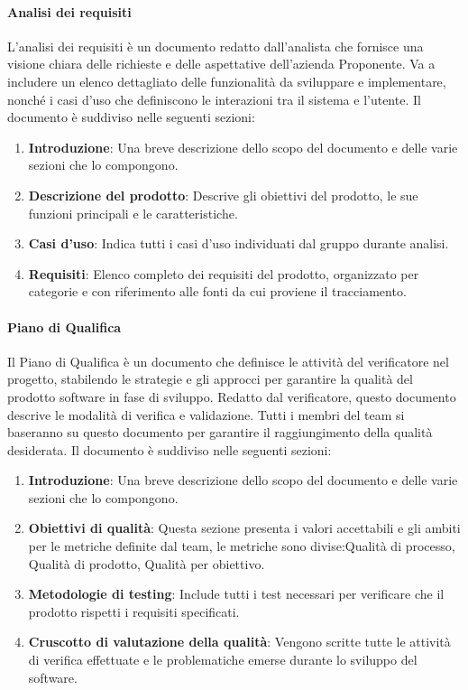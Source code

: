\paragraph{Analisi dei requisiti}
L’analisi dei requisiti è un documento redatto dall’analista che fornisce una visione chiara delle richieste e delle aspettative dell’azienda Proponente. Va a includere un elenco dettagliato delle funzionalità da sviluppare e implementare, nonché i casi d’uso che definiscono le interazioni tra il sistema e l’utente.
Il documento è suddiviso nelle seguenti sezioni:
\begin{enumerate}
    \item \textbf{Introduzione}: Una breve descrizione dello scopo del documento e delle varie sezioni che lo compongono.
    \item \textbf{Descrizione del prodotto}: Descrive gli obiettivi del prodotto, le sue funzioni principali e le caratteristiche.
    \item \textbf{Casi d’uso}: Indica tutti i casi d’uso individuati dal gruppo durante analisi.
    \item \textbf{Requisiti}: Elenco completo dei requisiti del prodotto, organizzato per categorie e con riferimento alle fonti da cui proviene il tracciamento.
\end{enumerate}

\paragraph{Piano di Qualifica}
Il Piano di Qualifica è un documento che definisce le attività del verificatore nel progetto, stabilendo le strategie e gli approcci per garantire la qualità del prodotto software in fase di sviluppo. Redatto dal verificatore, questo documento descrive le modalità di verifica e validazione. Tutti i membri del team si baseranno su questo documento per garantire il raggiungimento della qualità desiderata.
Il documento è suddiviso nelle seguenti sezioni: 
\begin{enumerate}
    \item \textbf{Introduzione}: Una breve descrizione dello scopo del documento e delle varie sezioni che lo compongono.
    \item \textbf{Obiettivi di qualità}: Questa sezione presenta i valori accettabili e gli ambiti per le metriche definite dal team, le metriche sono divise:Qualità di processo, Qualità di prodotto, Qualità per obiettivo.
    \item \textbf{Metodologie di testing}: Include tutti i test necessari per verificare che il prodotto rispetti i requisiti specificati.
    \item \textbf{Cruscotto di valutazione della qualità}: Vengono scritte tutte le attività di verifica effettuate e le problematiche emerse durante lo sviluppo del software.
\end{enumerate}

